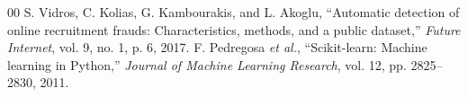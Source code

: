\documentclass[conference]{IEEEtran}
\begin{document}
\begin{thebibliography}{00}
 S. Vidros, C. Kolias, G. Kambourakis, and L. Akoglu, ``Automatic detection of online recruitment frauds: Characteristics, methods, and a public dataset,'' \emph{Future Internet}, vol. 9, no. 1, p. 6, 2017.
 F. Pedregosa \emph{et al.}, ``Scikit-learn: Machine learning in Python,'' \emph{Journal of Machine Learning Research}, vol. 12, pp. 2825--2830, 2011.
\end{thebibliography}
\end{document}
